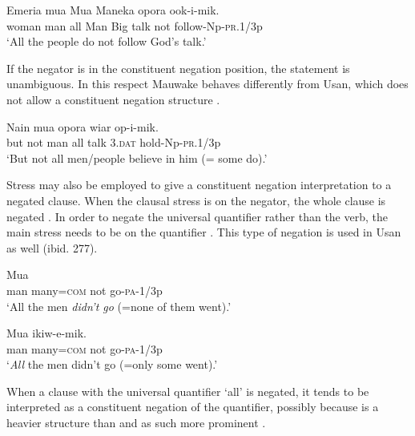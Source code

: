 \ea%
\label{ex:6:x1148}
\gll Emeria  mua    Mua  Maneka  opora    ook-i-mik. \\
woman  man  all  Man  Big  talk  not  follow-Np-\textsc{pr}.1/3p\\
\glt `All the people do not follow God's talk.'
\z

If the negator is in the constituent negation position, the statement is unambiguous. In this respect Mauwake behaves differently from Usan, which does not allow a constituent negation structure \citep[275--277]{Reesink1987}.

\ea%
\label{ex:6:x1149}
\gll Nain    mua    opora  wiar  op-i-mik. \\
but  not  man  all  talk  3.\textsc{dat}  hold-Np-\textsc{pr}.1/3p\\
\glt `But not all men/people believe in him (= some do).'
\z

Stress may also be employed to give a constituent negation interpretation to a negated clause. When the clausal stress is on the negator, the whole clause is negated . In order to negate the universal quantifier rather than the verb, the main stress needs to be on the quantifier . This type of negation is used in Usan as well (ibid. 277).

\ea%
\label{ex:6:x669}
\gll Mua      \\
man  many=\textsc{com}  not  go-\textsc{pa}-1/3p\\
\glt `All the men \textit{didn't go} (=none of them went).'
\z

\ea%
\label{ex:6:x671}
\gll Mua     ikiw-e-mik. \\
man  many=\textsc{com}  not  go-\textsc{pa}-1/3p\\
\glt `\textit{All} the men didn't go (=only some went).'
\z

When a clause with the universal quantifier  `all' is negated, it tends to be interpreted as a constituent negation of the quantifier, possibly because  is a heavier structure than  and as such more prominent .

